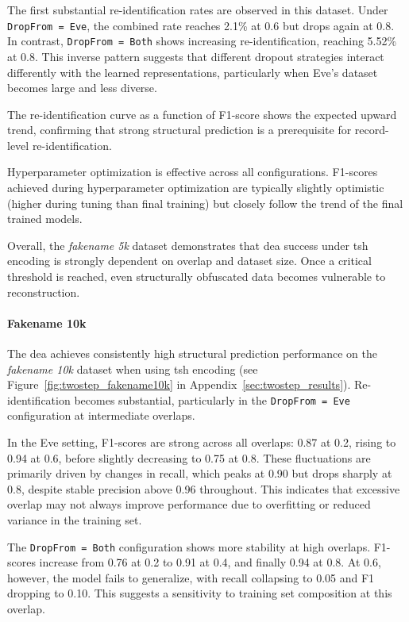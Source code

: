 The first substantial re-identification rates are observed in this dataset.
Under \texttt{DropFrom = Eve}, the combined rate reaches 2.1\% at 0.6 but drops again at 0.8.
In contrast, \texttt{DropFrom = Both} shows increasing re-identification, reaching 5.52\% at 0.8.
This inverse pattern suggests that different dropout strategies interact differently with the learned representations, particularly when Eve's dataset becomes large and less diverse.

The re-identification curve as a function of F1-score shows the expected upward trend, confirming that strong structural prediction is a prerequisite for record-level re-identification.

Hyperparameter optimization is effective across all configurations.
F1-scores achieved during hyperparameter optimization are typically slightly optimistic (higher during tuning than final training) but closely follow the trend of the final trained models.

Overall, the \textit{fakename 5k} dataset demonstrates that \ac{dea} success under \ac{tsh} encoding is strongly dependent on overlap and dataset size.
Once a critical threshold is reached, even structurally obfuscated data becomes vulnerable to reconstruction.



\paragraph{Fakename 10k}

The \ac{dea} achieves consistently high structural prediction performance on the \textit{fakename 10k} dataset when using \ac{tsh} encoding (see Figure~\ref{fig:twostep_fakename10k} in Appendix~\ref{sec:twostep_results}).
Re-identification becomes substantial, particularly in the \texttt{DropFrom = Eve} configuration at intermediate overlaps.

In the Eve setting, F1-scores are strong across all overlaps: 0.87 at 0.2, rising to 0.94 at 0.6, before slightly decreasing to 0.75 at 0.8.
These fluctuations are primarily driven by changes in recall, which peaks at 0.90 but drops sharply at 0.8, despite stable precision above 0.96 throughout.
This indicates that excessive overlap may not always improve performance due to overfitting or reduced variance in the training set.

The \texttt{DropFrom = Both} configuration shows more stability at high overlaps.
F1-scores increase from 0.76 at 0.2 to 0.91 at 0.4, and finally 0.94 at 0.8.
At 0.6, however, the model fails to generalize, with recall collapsing to 0.05 and F1 dropping to 0.10.
This suggests a sensitivity to training set composition at this overlap.

